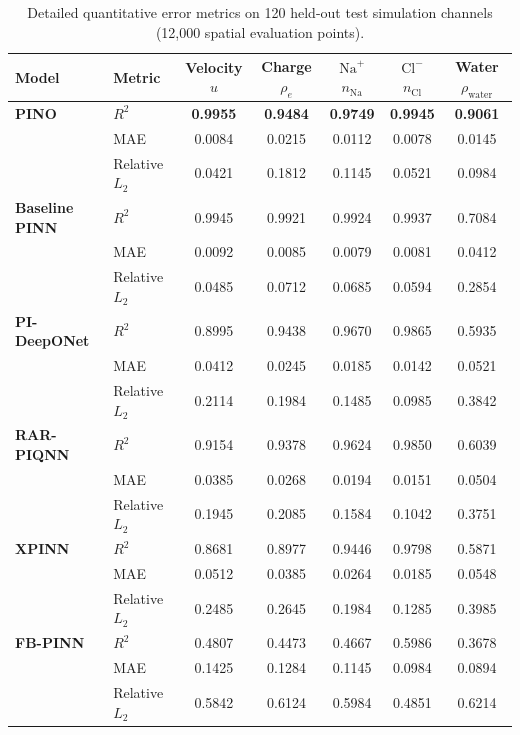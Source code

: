 \documentclass[3p,preprint,12pt,numbers,square,sort&compress]{elsarticle}
\begin{document}
\begin{table}[H]
\centering
\caption{Detailed quantitative error metrics on 120 held-out test simulation channels (12,000 spatial evaluation points).}
\label{tab:full_metrics}
\begin{tabular}{llccccc}
\toprule
\textbf{Model} & \textbf{Metric} & \textbf{Velocity $u$} & \textbf{Charge $\rho_e$} & \textbf{$\text{Na}^+$ $n_{\text{Na}}$} & \textbf{$\text{Cl}^-$ $n_{\text{Cl}}$} & \textbf{Water $\rho_{\text{water}}$} \\
\midrule
\textbf{PINO} & $R^2$ & \textbf{0.9955} & \textbf{0.9484} & \textbf{0.9749} & \textbf{0.9945} & \textbf{0.9061} \\
& MAE & 0.0084 & 0.0215 & 0.0112 & 0.0078 & 0.0145 \\
& Relative $L_2$ & 0.0421 & 0.1812 & 0.1145 & 0.0521 & 0.0984 \\
\midrule
\textbf{Baseline PINN} & $R^2$ & 0.9945 & 0.9921 & 0.9924 & 0.9937 & 0.7084 \\
& MAE & 0.0092 & 0.0085 & 0.0079 & 0.0081 & 0.0412 \\
& Relative $L_2$ & 0.0485 & 0.0712 & 0.0685 & 0.0594 & 0.2854 \\
\midrule
\textbf{PI-DeepONet} & $R^2$ & 0.8995 & 0.9438 & 0.9670 & 0.9865 & 0.5935 \\
& MAE & 0.0412 & 0.0245 & 0.0185 & 0.0142 & 0.0521 \\
& Relative $L_2$ & 0.2114 & 0.1984 & 0.1485 & 0.0985 & 0.3842 \\
\midrule
\textbf{RAR-PIQNN} & $R^2$ & 0.9154 & 0.9378 & 0.9624 & 0.9850 & 0.6039 \\
& MAE & 0.0385 & 0.0268 & 0.0194 & 0.0151 & 0.0504 \\
& Relative $L_2$ & 0.1945 & 0.2085 & 0.1584 & 0.1042 & 0.3751 \\
\midrule
\textbf{XPINN} & $R^2$ & 0.8681 & 0.8977 & 0.9446 & 0.9798 & 0.5871 \\
& MAE & 0.0512 & 0.0385 & 0.0264 & 0.0185 & 0.0548 \\
& Relative $L_2$ & 0.2485 & 0.2645 & 0.1984 & 0.1285 & 0.3985 \\
\midrule
\textbf{FB-PINN} & $R^2$ & 0.4807 & 0.4473 & 0.4667 & 0.5986 & 0.3678 \\
& MAE & 0.1425 & 0.1284 & 0.1145 & 0.0984 & 0.0894 \\
& Relative $L_2$ & 0.5842 & 0.6124 & 0.5984 & 0.4851 & 0.6214 \\
\bottomrule
\end{tabular}
\end{table}
\end{document}
